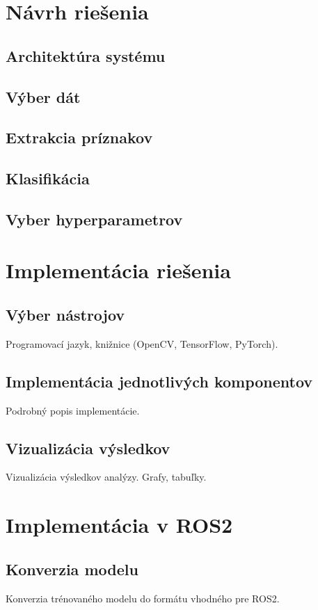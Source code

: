 \section{Návrh riešenia}

\subsection{Architektúra systému}
\subsection{Výber dát}
\subsection{Extrakcia príznakov}
\subsection{Klasifikácia}
\subsection{Vyber hyperparametrov}

\section{Implementácia riešenia}
\subsection{Výber nástrojov}Programovací jazyk, knižnice (OpenCV, TensorFlow, PyTorch).
\subsection{Implementácia jednotlivých komponentov}Podrobný popis implementácie.
\subsection{Vizualizácia výsledkov}Vizualizácia výsledkov analýzy. Grafy, tabuľky.


\section{Implementácia v ROS2}
\subsection{Konverzia modelu}Konverzia trénovaného modelu do formátu vhodného pre ROS2.
